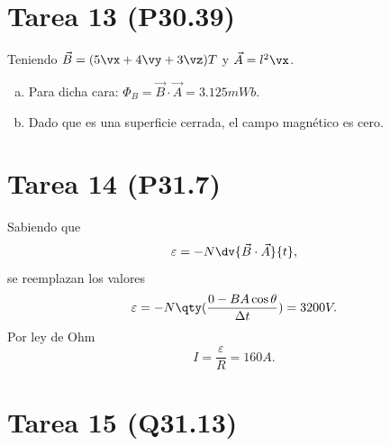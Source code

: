 \section*{Tarea 13 (P30.39)}

Teniendo $\vec{B} = (5\vx + 4\vy + 3\vz)T$ y $\vec{A} = l^2 \vx$.
\begin{enumerate}[a)]
	\item Para dicha cara: $\Phi _B = \vec{B} \cdot \vec{A} = \boxed{3.125mWb}$.
	\item Dado que es una superficie cerrada, el campo magnético es cero.
\end{enumerate}

































\section*{Tarea 14 (P31.7)}

Sabiendo que
	$$ \varepsilon = -N \dv{\vec{B} \cdot \vec{A}}{t}, $$
se reemplazan los valores
	$$ \varepsilon = -N \qty(\frac{0 - BA\cos{\theta}}{\Delta t}) = 3200V. $$
Por ley de Ohm
	$$ \boxed{I = \frac{\varepsilon}{R} = 160A.} $$





























\section*{Tarea 15 (Q31.13)}

